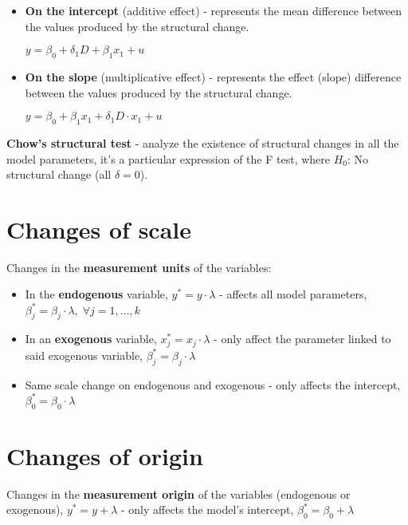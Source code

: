 \documentclass[10pt, a4paper, landscape]{article}
\begin{document}
\begin{multicols}{3}
\begin{itemize}[leftmargin=*]
	\item \textbf{On the intercept} (additive effect) - represents the mean difference between the values produced by the structural change.
	\begin{center}
		\( y = \beta_{0} + \delta_{1} D + \beta_{1} x_{1} + u \)
	\end{center}
	\item \textbf{On the slope} (multiplicative effect) - represents the effect (slope) difference between the values produced by the structural change.
	\begin{center}
		\( y = \beta_{0} + \beta_{1} x_{1} + \delta_{1} D \cdot x_{1} + u \)
	\end{center}
\end{itemize}

\textbf{Chow's structural test} - analyze the existence of structural changes in all the model parameters, it's a particular expression of the F test, where \( H_{0} \): No structural change (all \( \delta = 0 \)).

\section*{Changes of scale}

Changes in the \textbf{measurement units} of the variables:

\begin{itemize}[leftmargin=*]
	\item In the \textbf{endogenous} variable, \( y^{*} = y \cdot \lambda \) - affects all model parameters, \( \beta_{j}^{*} = \beta_{j} \cdot \lambda, \; \forall j = 1, \ldots, k \)
	\item In an \textbf{exogenous} variable, \( x_{j}^{*} = x_{j} \cdot \lambda \) - only affect the parameter linked to said exogenous variable, \( \beta_{j}^{*} = \beta_{j} \cdot \lambda \)
	\item Same scale change on endogenous and exogenous - only affects the intercept, \( \beta_{0}^{*} = \beta_{0} \cdot \lambda \)
\end{itemize}

\section*{Changes of origin}

Changes in the \textbf{measurement origin} of the variables (endogenous or exogenous), \( y^{*} = y + \lambda \) - only affects the model's intercept, \( \beta_{0}^{*} = \beta_{0} + \lambda \)


\end{multicols}
\end{document}
